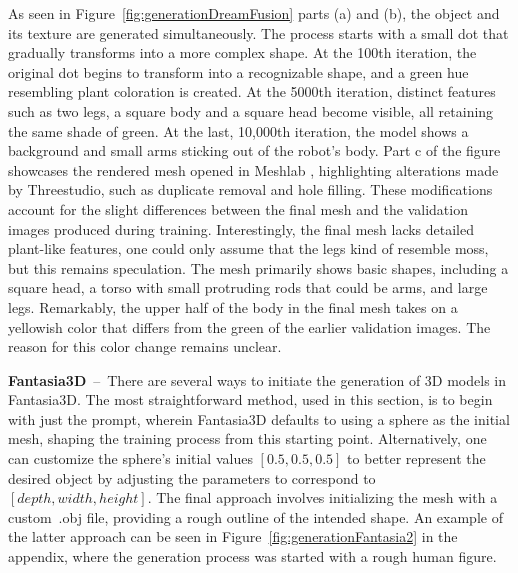 As seen in Figure~\ref{fig:generationDreamFusion} parts (a) and (b), the object and its texture are generated simultaneously. The process starts with a small dot that gradually transforms into a more complex shape. At the 100th iteration, the original dot begins to transform into a recognizable shape, and a green hue resembling plant coloration is created. At the 5000th iteration, distinct features such as two legs, a square body and a square head become visible, all retaining the same shade of green. At the last, 10,000th iteration, the model shows a background and small arms sticking out of the robot's body.
Part c of the figure showcases the rendered mesh opened in Meshlab \citep{meshLab}, highlighting alterations made by Threestudio, such as duplicate removal and hole filling. These modifications account for the slight differences between the final mesh and the validation images produced during training. Interestingly, the final mesh lacks detailed plant-like features, one could only assume that the legs kind of resemble moss, but this remains speculation. The mesh primarily shows basic shapes, including a square head, a torso with small protruding rods that could be arms, and large legs. Remarkably, the upper half of the body in the final mesh takes on a yellowish color that differs from the green of the earlier validation images. The reason for this color change remains unclear.

\textbf{Fantasia3D}~--~There are several ways to initiate the generation of 3D models in Fantasia3D. The most straightforward method, used in this section, is to begin with just the prompt, wherein Fantasia3D defaults to using a sphere as the initial mesh, shaping the training process from this starting point. Alternatively, one can customize the sphere's initial values  \([0.5, 0.5, 0.5]\) to better represent the desired object by adjusting the parameters to correspond to \([depth, width, height]\). The final approach involves initializing the mesh with a custom~.obj file, providing a rough outline of the intended shape. An example of the latter approach can be seen in Figure~\ref{fig:generationFantasia2} in the appendix, where the generation process was started with a rough human figure.

